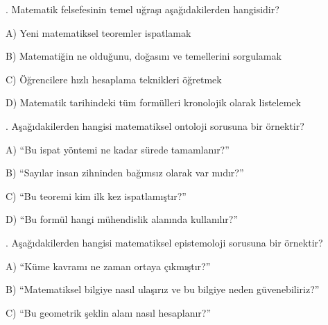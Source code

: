 \par\smallskip{}. Matematik felsefesinin temel uğraşı aşağıdakilerden hangisidir?

\par\noindent\hspace*{1.6em}A) Yeni matematiksel teoremler ispatlamak

\par\noindent\hspace*{1.6em}B) Matematiğin ne olduğunu, doğasını ve temellerini sorgulamak

\par\noindent\hspace*{1.6em}C) Öğrencilere hızlı hesaplama teknikleri öğretmek

\par\noindent\hspace*{1.6em}D) Matematik tarihindeki tüm formülleri kronolojik olarak listelemek

\par\smallskip{}. Aşağıdakilerden hangisi matematiksel ontoloji sorusuna bir örnektir?

\par\noindent\hspace*{1.6em}A) “Bu ispat yöntemi ne kadar sürede tamamlanır?”

\par\noindent\hspace*{1.6em}B) “Sayılar insan zihninden bağımsız olarak var mıdır?”

\par\noindent\hspace*{1.6em}C) “Bu teoremi kim ilk kez ispatlamıştır?”

\par\noindent\hspace*{1.6em}D) “Bu formül hangi mühendislik alanında kullanılır?”

\par\smallskip{}. Aşağıdakilerden hangisi matematiksel epistemoloji sorusuna bir örnektir?

\par\noindent\hspace*{1.6em}A) “Küme kavramı ne zaman ortaya çıkmıştır?”

\par\noindent\hspace*{1.6em}B) “Matematiksel bilgiye nasıl ulaşırız ve bu bilgiye neden güvenebiliriz?”

\par\noindent\hspace*{1.6em}C) “Bu geometrik şeklin alanı nasıl hesaplanır?”

